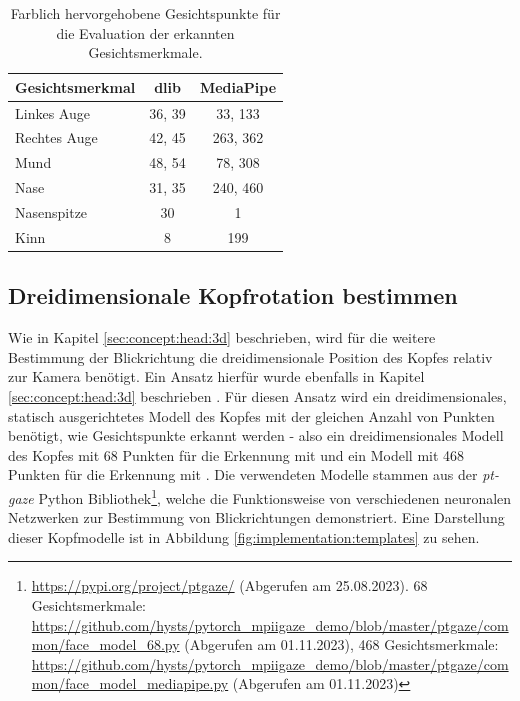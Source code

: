 \begin{table}[]
    \centering
    \begin{tabular}{l c c }
    \toprule
        \textbf{Gesichtsmerkmal} & \textbf{dlib} & \textbf{MediaPipe} \\ \midrule
        Linkes Auge & 36, 39 & 33, 133 \\
        Rechtes Auge & 42, 45 & 263, 362 \\
        Mund & 48, 54 & 78, 308 \\
        Nase & 31, 35& 240, 460\\
        Nasenspitze & 30 & 1 \\
        Kinn & 8 & 199\\
        \bottomrule
    \end{tabular}
    \caption{Farblich hervorgehobene Gesichtspunkte für die Evaluation der erkannten Gesichtsmerkmale.}
    \label{tab:implementation:used:landmarks}
\end{table}

\subsection{Dreidimensionale Kopfrotation bestimmen}\label{sec:implementation:face:3d}

Wie in Kapitel \ref{sec:concept:head:3d} beschrieben, wird für die weitere Bestimmung der Blickrichtung die dreidimensionale Position des Kopfes relativ zur Kamera benötigt. Ein Ansatz hierfür wurde ebenfalls in Kapitel \ref{sec:concept:head:3d} beschrieben \cite{paper:eth-xgaze, paper:mpiigaze}. Für diesen Ansatz wird ein dreidimensionales, statisch ausgerichtetes Modell des Kopfes mit der gleichen Anzahl von Punkten benötigt, wie Gesichtspunkte erkannt werden - also ein dreidimensionales Modell des Kopfes mit 68 Punkten für die Erkennung mit \dlib und ein Modell mit 468 Punkten für die Erkennung mit \mediapipe. Die verwendeten Modelle stammen aus der \textit{pt-gaze} Python Bibliothek\footnote{\url{https://pypi.org/project/ptgaze/} (Abgerufen am 25.08.2023). 68 Gesichtsmerkmale: \url{https://github.com/hysts/pytorch_mpiigaze_demo/blob/master/ptgaze/common/face_model_68.py} (Abgerufen am 01.11.2023), 468 Gesichtsmerkmale: \url{https://github.com/hysts/pytorch_mpiigaze_demo/blob/master/ptgaze/common/face_model_mediapipe.py} (Abgerufen am 01.11.2023)}, welche die Funktionsweise von verschiedenen neuronalen Netzwerken zur Bestimmung von Blickrichtungen demonstriert. Eine Darstellung dieser Kopfmodelle ist in Abbildung \ref{fig:implementation:templates} zu sehen.

